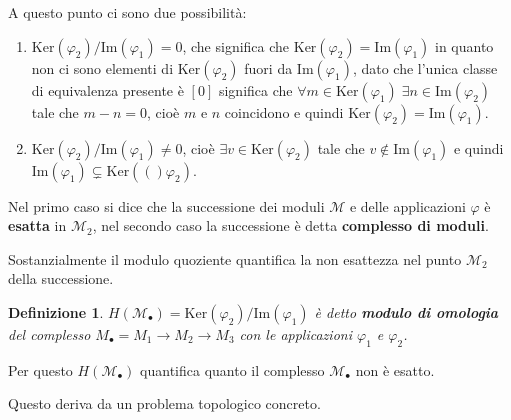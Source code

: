 \documentclass[10pt, twoside=false, x11names]{scrbook}
\newtheorem{definition}[theorem]{Definizione}
\newcommand{\M}{\mathcal{M}}
\newcommand{\im}[1]{\mathrm{Im}( #1 )}
\renewcommand{\ker}[1]{\mathrm{Ker}( #1)}
\renewcommand{\phi}{\varphi}
\begin{document}
A questo punto ci sono due possibilità:
\begin{enumerate}
\item $ {\ker {\phi_2}} \slash {\im{\phi_1}} = 0 $, che significa che $ \ker {\phi_2} = \im{\phi_1} $
  in quanto non ci sono elementi di $ \ker {\phi_2} $ fuori da $ \im{\phi_1} $, dato che l'unica
  classe di equivalenza presente è $ [0] $ significa che $ \forall m \in \ker{\phi_1} \; \exists n \in \im{\phi_2} $
  tale che $ m - n = 0 $, cioè $ m $ e $ n $ coincidono e quindi $ \ker {\phi_2} = \im{\phi_1} $.
\item $ {\ker {\phi_2}} \slash {\im{\phi_1}} \not= 0 $, cioè $ \exists v \in \ker {\phi_2} $
  tale che $ v \not \in \im {\phi_1} $ e quindi $ \im {\phi_1} \subsetneq \ker (\phi_2) $.
\end{enumerate}
Nel primo caso si dice che la successione dei moduli $ \M $ e delle
applicazioni $ \phi $ è \textbf{esatta} in $ \M_2$, nel secondo caso la
successione è detta \textbf{complesso di moduli}.

Sostanzialmente il modulo quoziente quantifica la non esattezza nel punto $ \M_2 $
della successione.

\begin{definition}
  $ H(\M_\bullet) = {\ker {\phi_2}} \slash {\im {\phi_1}} $ è detto \textbf{modulo di omologia} 
  del complesso $ M_\bullet = M_1 \longrightarrow M_2 \longrightarrow M_3 $ con le applicazioni $ \phi_1 $ e $ \phi_2 $.
\end{definition}
Per questo  $ H(\M_\bullet) $ quantifica quanto il complesso $ \M_\bullet $ non è esatto.

Questo deriva da un problema topologico concreto.
\end{document}
